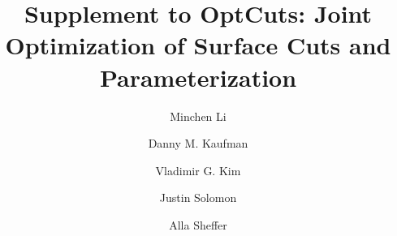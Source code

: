 \documentclass[acmlarge]{supp}
\begin{document}
\title{Supplement to OptCuts: Joint Optimization of Surface Cuts and Parameterization
} 

\author{Minchen Li}

\author{Danny M. Kaufman}

\author{Vladimir G. Kim} 

\author{Justin Solomon}

\author{Alla Sheffer}

\renewcommand\shortauthors{Li, M. et al}
\end{document}
